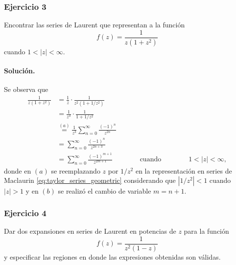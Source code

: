 \documentclass[a4paper]{report}
\begin{document}
\subsubsection*{Ejercicio 3}

Encontrar las series de Laurent que representan a la función
\[
 f(z)=\frac{1}{z(1+z^2)}
\]
cuando \(1<|z|<\infty\).

\paragraph{Solución.} Se observa que 
\begin{align*}
 \frac{1}{z(1+z^2)}&=\frac{1}{z}\cdot\frac{1}{z^2(1+1/z^2)}\\
  &=\frac{1}{z^3}\cdot\frac{1}{1+1/z^2}\\
  &\overset{(a)}{=}\frac{1}{z^3}\sum_{n=0}^\infty\frac{(-1)^n}{z^{2n}}\\
  &=\sum_{n=0}^\infty\frac{(-1)^n}{z^{2n+3}}\\
  &=\sum_{n=0}^\infty\frac{(-1)^{m+1}}{z^{2m+1}}
  \qquad\qquad\textrm{cuando}\qquad\qquad
   1<|z|<\infty,
\end{align*}
donde en \((a)\) se reemplazando \(z\) por \(1/z^2\) en la representación en series de Maclaurin \ref{eq:taylor_series_geometric} considerando que \(|1/z^2|<1\) cuando \(|z|>1\) y en \((b)\) se realizó el cambio de variable \(m=n+1\).

\subsubsection*{Ejercicio 4}

Dar dos expansiones en series de Laurent en potencias de \(z\) para la función 
\[
 f(z)=\frac{1}{z^2(1-z)}
\]
y especificar las regiones en donde las expresiones obtenidas son válidas.
\end{document}

